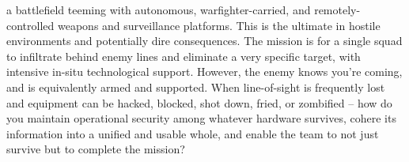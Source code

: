 a battlefield teeming with autonomous, warfighter-carried, and remotely-controlled weapons and surveillance platforms.
This is the ultimate in hostile environments and potentially dire consequences.
The mission is for a single squad to infiltrate behind enemy lines and eliminate a very specific target, with intensive in-situ technological support.
However, the enemy knows you're coming, and is equivalently armed and supported.
When line-of-sight is frequently lost and equipment can be hacked, blocked, shot down, fried, or zombified -- how do you maintain operational security among whatever hardware survives, cohere its information into a unified and usable whole, and enable the team to not just survive but to complete the mission?
